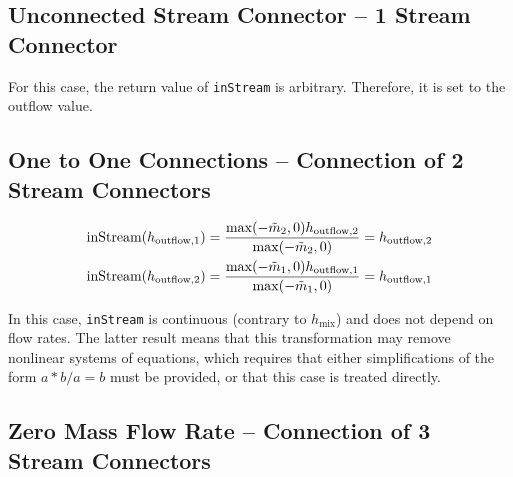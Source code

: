 \subsection{Unconnected Stream Connector -- 1 Stream Connector}\label{stream-connector-is-not-connected-n-1}\label{unconnected-stream-connector-1-stream-connector}

For this case, the return value of \lstinline!inStream! is arbitrary.
Therefore, it is set to the outflow value.

\subsection{One to One Connections -- Connection of 2 Stream Connectors}\label{connection-of-2-stream-connectors-one-to-one-connections-n-2}\label{one-to-one-connections-connection-of-2-stream-connectors}

\begin{align*}
\text{\lstinline!inStream!}(h_{\mathrm{outflow},1}) &= \frac{\operatorname{max}(-\tilde{m}_2,0)h_{\mathrm{outflow},2}}{\operatorname{max}(-\tilde{m}_2,0)}=h_{\mathrm{outflow},2}\\
\text{\lstinline!inStream!}(h_{\mathrm{outflow},2}) &= \frac{\operatorname{max}(-\tilde{m}_1,0)h_{\mathrm{outflow},1}}{\operatorname{max}(-\tilde{m}_1,0)}=h_{\mathrm{outflow},1}
\end{align*}

In this case, \lstinline!inStream! is continuous (contrary to $h_{\mathrm{mix}}$) and does not
depend on flow rates. The latter result means that this transformation
may remove nonlinear systems of equations, which requires that either
simplifications of the form $a * b / a = b$ must be provided, or that this
case is treated directly.

\subsection{Zero Mass Flow Rate -- Connection of 3 Stream Connectors}\label{connection-of-3-stream-connectors-where-one-mass-flow-rate-is-identical-to-zero-n-3-and}\label{zero-mass-flow-rate-connection-of-3-stream-connectors}

